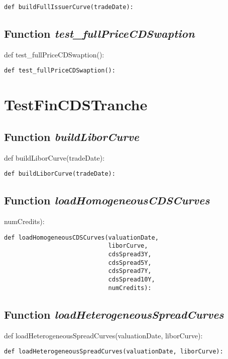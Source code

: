\documentclass[twoside,11pt]{book}
\begin{document}
\begin{lstlisting}
def buildFullIssuerCurve(tradeDate):
\end{lstlisting}

\subsection{Function {\it test\_fullPriceCDSwaption}}
def test\_fullPriceCDSwaption():

\begin{lstlisting}
def test_fullPriceCDSwaption():
\end{lstlisting}


\newpage
\section{TestFinCDSTranche}

\subsection{Function {\it buildLiborCurve}}
def buildLiborCurve(tradeDate):

\begin{lstlisting}
def buildLiborCurve(tradeDate):
\end{lstlisting}

\subsection{Function {\it loadHomogeneousCDSCurves}}
numCredits):

\begin{lstlisting}
def loadHomogeneousCDSCurves(valuationDate,
                             liborCurve,
                             cdsSpread3Y,
                             cdsSpread5Y,
                             cdsSpread7Y,
                             cdsSpread10Y,
                             numCredits):
\end{lstlisting}

\subsection{Function {\it loadHeterogeneousSpreadCurves}}
def loadHeterogeneousSpreadCurves(valuationDate, liborCurve):

\begin{lstlisting}
def loadHeterogeneousSpreadCurves(valuationDate, liborCurve):
\end{lstlisting}
\end{document}
